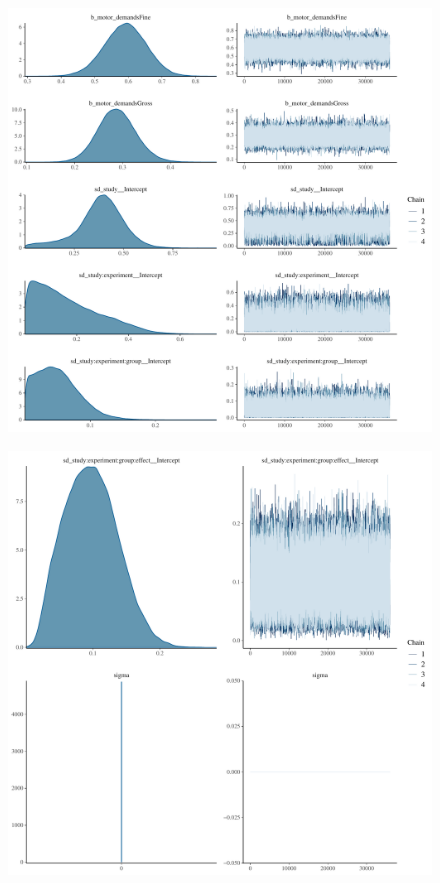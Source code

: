 \documentclass[
]{report}
\begin{document}
\begin{figure}

{\centering \includegraphics[width=1\textwidth,height=\textheight]{diagnostic_plots_files/figure-pdf/unnamed-chunk-5-1.pdf}

}

\end{figure}

\begin{figure}

{\centering \includegraphics[width=1\textwidth,height=\textheight]{diagnostic_plots_files/figure-pdf/unnamed-chunk-5-2.pdf}

}

\end{figure}
\end{document}
